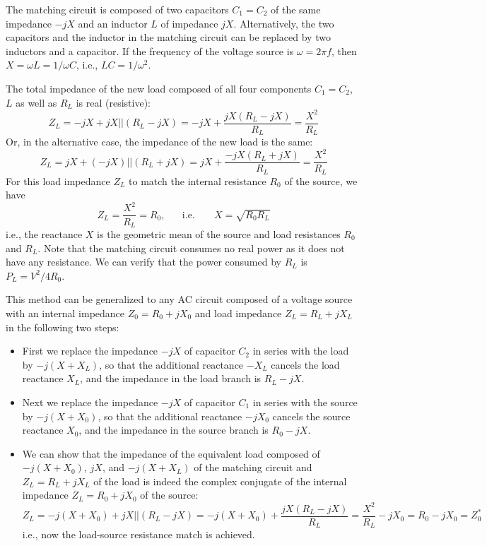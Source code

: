 The matching circuit is composed of two capacitors $C_1=C_2$ of the same 
impedance $-jX$ and an inductor $L$ of impedance $jX$. Alternatively, the 
two capacitors and the inductor in the matching circuit can be replaced by 
two inductors and a capacitor. If the frequency of the voltage source is 
$\omega=2\pi f$, then $X=\omega L=1/\omega C$, i.e., $LC=1/\omega^2$.


The total impedance of the new load composed of all four components $C_1=C_2$,
$L$ as well as $R_L$ is real (resistive):
\[ 
Z_L=-jX+jX || (R_L-jX)=-jX+\frac{jX(R_L-jX)}{R_L}=\frac{X^2}{R_L} 
\]
Or, in the alternative case, the impedance of the new load is the same:
\[
Z_L=jX+(-jX) || (R_L+jX)=jX+\frac{-jX(R_L+jX)}{R_L}=\frac{X^2}{R_L} 
\]
For this load impedance $Z_L$ to match the internal resistance $R_0$ of the 
source, we have
\[
Z_L=\frac{X^2}{R_L}=R_0,\;\;\;\;\;\;\mbox{i.e.}\;\;\;\;\;\;\;X=\sqrt{R_0R_L} 
\]
i.e., the reactance $X$ is the geometric mean of the source and load resistances
$R_0$ and $R_L$. Note that the matching circuit consumes no real power as it 
does not have any resistance. We can verify that the power consumed by $R_L$ is 
$P_L=V^2/4R_0$.

This method can be generalized to any AC circuit composed of a voltage 
source with an internal impedance $Z_0=R_0+jX_0$ and load impedance 
$Z_L=R_L+jX_L$ in the following two steps:
\begin{itemize}
\item First we replace the impedance $-jX$ of capacitor $C_2$ in series 
  with the load by $-j(X+X_L)$, so that the additional reactance $-X_L$ 
  cancels the load reactance $X_L$, and the impedance in the load branch
  is $R_L-jX$.
\item Next we replace the impedance $-jX$ of capacitor $C_1$ in series 
  with the source by $-j(X+X_0)$, so that the additional reactance $-jX_0$
  cancels the source reactance $X_0$, and the impedance in the source
  branch is $R_0-jX$.
\item We can show that the impedance of the equivalent load composed 
  of $-j(X+X_0)$, $jX$, and $-j(X+X_L)$ of the matching circuit and 
  $Z_L=R_L+jX_L$ of the load is indeed the complex conjugate of the
  internal impedance $Z_L=R_0+jX_0$ of the source:
  \[ 
  Z_L=-j(X+X_0)+jX || (R_L-jX)=-j(X+X_0)+\frac{jX(R_L-jX)}{R_L}
  =\frac{X^2}{R_L}-jX_0=R_0-jX_0 =Z^*_0 
  \]
  i.e., now the load-source resistance match is achieved. 
\end{itemize}

